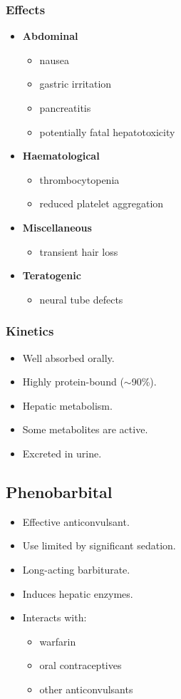 \documentclass[11pt,a4paper]{article}
\begin{document}
\subsubsection{Effects}
\begin{itemize}
  \item \textbf{Abdominal}
  \begin{itemize}
    \item nausea
    \item gastric irritation
    \item pancreatitis
    \item potentially fatal hepatotoxicity
  \end{itemize}
  \item \textbf{Haematological}
  \begin{itemize}
    \item thrombocytopenia
    \item reduced platelet aggregation
  \end{itemize}
  \item \textbf{Miscellaneous}
  \begin{itemize}
    \item transient hair loss
  \end{itemize}
  \item \textbf{Teratogenic}
  \begin{itemize}
    \item neural tube defects
  \end{itemize}
\end{itemize}

\subsubsection{Kinetics}
\begin{itemize}
  \item Well absorbed orally.
  \item Highly protein-bound ($\sim$90\%).
  \item Hepatic metabolism.
  \item Some metabolites are active.
  \item Excreted in urine.
\end{itemize}

\subsection{Phenobarbital}
\begin{itemize}
  \item Effective anticonvulsant.
  \item Use limited by significant sedation.
  \item Long-acting barbiturate.
  \item Induces hepatic enzymes.
  \item Interacts with:
  \begin{itemize}
    \item warfarin
    \item oral contraceptives
    \item other anticonvulsants
  \end{itemize}
\end{itemize}
\end{document}
